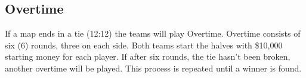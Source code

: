 \documentclass{article}
\begin{document}
\subsection{Overtime}
If a map ends in a tie (12:12) the teams will play Overtime. Overtime consists of six (6) rounds, three on each side. Both teams
start the halves with \$10,000 starting money for each player. If after six rounds, the tie hasn't been broken, another overtime will be played. This process is repeated until a winner is found. 
\end{document}
